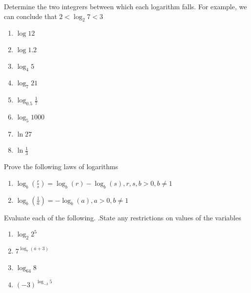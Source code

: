 \documentclass[10pt,]{book}
\theoremstyle{ptxdefinitionnotitle}
\theoremstyle{ptxdefinitiontitle}
\theoremstyle{ptxdefinitionnotitle}
\theoremstyle{ptxdefinitiontitle}
\theoremstyle{ptxdefinitionnotitle}
\theoremstyle{ptxdefinitiontitle}
\numberwithin{equation}{section}
\newcommand{\lt}{<}
\newcommand{\gt}{>}
\begin{document}
\begin{divisionexercise}{4}\hypertarget{exercise-78}{}
\hypertarget{p-302}{}%
Determine the two integrers between which each logarithm falls. For example, we can conclude that \(2 \lt \log_2 7 \lt 3\)%
\leavevmode%
\begin{enumerate}[label=(\alph*)]
\item\hypertarget{li-192}{}\(\log 12\)%
\item\hypertarget{li-193}{}\(\log 1.2\)%
\item\hypertarget{li-194}{}\(\log_4 5\)%
\item\hypertarget{li-195}{}\(\log_7 21\)%
\item\hypertarget{li-196}{}\(\log_{0.5} \frac{1}{7}\)%
\item\hypertarget{li-197}{}\(\log_5 1000\)%
\item\hypertarget{li-198}{}\(\ln 27\)%
\item\hypertarget{li-199}{}\(\ln \frac{1}{3}\)%
\end{enumerate}
\end{divisionexercise}%
\begin{divisionexercise}{5}\hypertarget{exercise-79}{}
\hypertarget{p-303}{}%
Prove the following laws of logarithms%
\leavevmode%
\begin{enumerate}[label=(\alph*)]
\item\hypertarget{li-200}{}\(\log_b \left( \frac{r}{s} \right) = \log_b(r) - \log_b(s), r, s, b > 0, b \neq 1\)%
\item\hypertarget{li-201}{}\(\log_b \left( \frac{1}{a} \right) = -\log_b(a),  a \gt 0, b \neq 1\)%
\end{enumerate}
\end{divisionexercise}%
\begin{divisionexercise}{6}\hypertarget{exercise-80}{}
\hypertarget{p-304}{}%
Evaluate each of the following. .State any restrictions on values of the variables%
\leavevmode%
\begin{enumerate}[label=(\alph*)]
\item\hypertarget{li-202}{}\(\log_2 2^5\)%
\item\hypertarget{li-203}{}\(7 ^ {\log_7 \left( a+3 \right)}\)%
\item\hypertarget{li-204}{}\(\log_{64} 8\)%
\item\hypertarget{li-205}{}\(\left( -3 \right)^{\log_{-3}5}\)%
\end{enumerate}
\end{divisionexercise}%
\end{document}
